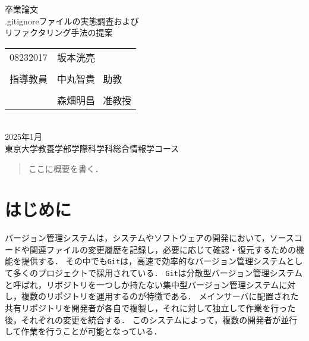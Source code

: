 \documentclass[a4paper,xelatex,ja=standard,fontsize=11pt]{bxjsreport}
\newcommand{\git}{\texttt{Git}}
\begin{document}
\begin{titlepage}
	\begin{center}
		\vspace*{\fill}
		\vspace{40pt}
		{\Large 卒業論文}
		\vspace{20pt} \\
		{\huge .gitignoreファイルの実態調査および \\\vspace{10pt} リファクタリング手法の提案} \\
		\vspace{160pt}
		\begin{tabular}{rl}
			{\Large 08232017} & {\LARGE 坂本洸亮}       \\
			\vspace{10pt}                           \\
			{\Large 指導教員}     & {\Large 中丸智貴 \ 助教}  \\
			\vspace{-10pt}                          \\
			                  & {\Large 森畑明昌 \ 准教授}
		\end{tabular}
		\vspace{60pt} \\
		{\Large 2025年1月}
		\vspace{60pt} \\
		{\Large 東京大学教養学部学際科学科総合情報学コース}
		\vspace*{\fill}
	\end{center}
\end{titlepage}

\begin{abstract}
	ここに概要を書く．
\end{abstract}

\setcounter{tocdepth}{2}
\tableofcontents
\thispagestyle{empty}
\restoregeometry

\mainmatter

\pagestyle{headings}

%
\chapter{はじめに}

バージョン管理システムは，システムやソフトウェアの開発において，ソースコードや関連ファイルの変更履歴を記録し，必要に応じて確認・復元するための機能を提供する．
その中でも\git{}は，高速で効率的なバージョン管理システムとして多くのプロジェクトで採用されている．
\git{}は分散型バージョン管理システムと呼ばれ，リポジトリを一つしか持たない集中型バージョン管理システムに対し，複数のリポジトリを運用するのが特徴である．
メインサーバに配置された共有リポジトリを開発者が各自で複製し，それに対して独立して作業を行った後，それぞれの変更を統合する．
このシステムによって，複数の開発者が並行して作業を行うことが可能となっている．
\end{document}
